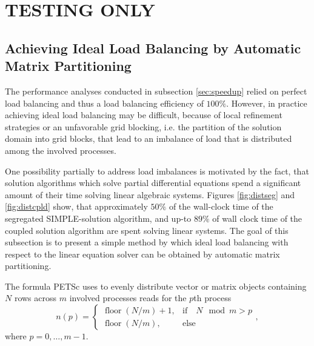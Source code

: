 \section{TESTING ONLY}

\subsection{Achieving Ideal Load Balancing by Automatic Matrix Partitioning}

The performance analyses conducted in subsection \ref{sec:speedup} relied on perfect load balancing and thus a load balancing efficiency of \(100\%\). However, in practice achieving ideal load balancing may be difficult, because of local refinement strategies or an unfavorable grid blocking, i.e. the partition of the solution domain into grid blocks, that lead to an imbalance of load that is distributed among the involved processes. 

One possibility partially to address load imbalances is motivated by the fact, that solution algorithms which solve partial differential equations spend a significant amount of their time solving linear algebraic systems. Figures \ref{fig:distseg} and \ref{fig:distcpld} show, that approximately \(50\%\) of the wall-clock time of the segregated SIMPLE-solution algorithm, and up-to \(89\%\) of wall clock time of the coupled solution algorithm are spent solving linear systems. The goal of this subsection is to present a simple method by which ideal load balancing with respect to the linear equation solver can be obtained by automatic matrix partitioning.

The formula PETSc uses to evenly distribute vector or matrix objects containing \(N\) rows across \(m\) involved processes reads for the \(p\)th process
\begin{displaymath}
n(p)
=
\left\{\begin{array}{ll} 
    \operatorname{floor}(N/m) + 1, & \text{if} \quad  N \mod m > p \\
    \operatorname{floor}(N/m) , & \text{else}
\end{array}\right.
,
\end{displaymath}
where \(p = 0,\dots,m-1\).

